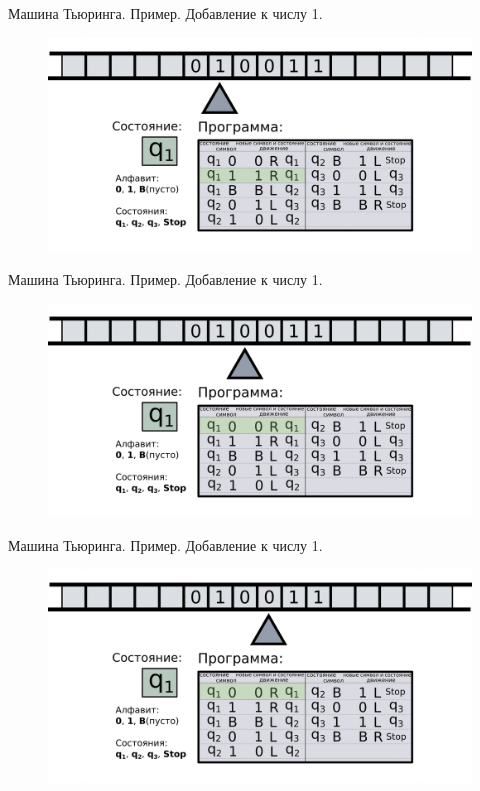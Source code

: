 \documentclass[10pt]{beamer}
\begin{document}
\begin{frame}{Машина Тьюринга. Пример. Добавление к числу 1.}
	\begin{figure}
		\centerline{\includegraphics[width=1.5\linewidth]{images/tm_ex_3.png}}
	\end{figure}
\end{frame}

\begin{frame}{Машина Тьюринга. Пример. Добавление к числу 1.}
	\begin{figure}
		\centerline{\includegraphics[width=1.5\linewidth]{images/tm_ex_4.png}}
	\end{figure}
\end{frame}

\begin{frame}{Машина Тьюринга. Пример. Добавление к числу 1.}
	\begin{figure}
		\centerline{\includegraphics[width=1.5\linewidth]{images/tm_ex_5.png}}
	\end{figure}
\end{frame}
\end{document}
